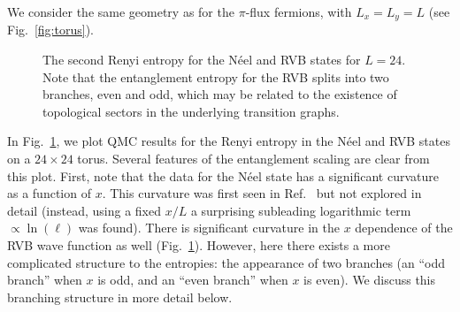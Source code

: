 \documentclass[prl,aps,twocolumn,floatfix,amsmath,amssymb,superscriptaddress,tightenlines]{revtex4}
\begin{document}
We consider the same geometry as for the $\pi$-flux fermions, with $L_x=L_y=L$ (see Fig.~\ref{fig:torus}).
 \begin{figure}
   \begin{center}
   \end{center}
   \caption{ The second Renyi entropy for the N\'eel and RVB states for $L=24$. Note that the entanglement entropy for the RVB splits into two branches, even and odd, which may be related to the existence of topological sectors in the underlying transition graphs.
   \label{fig:heis_bow} }
 \end{figure}
In Fig.~{\ref{fig:heis_bow}}, we plot QMC results for the Renyi entropy in the N\'eel and RVB states on a $24 \times 24$ torus.  
Several features of the entanglement scaling are clear from this plot.  First, note that the data for the N\'eel state has a significant curvature as a function of $x$.  This curvature was first seen in Ref.~\cite{HeisLog} but not explored in detail (instead, using a fixed $x/L$ a surprising subleading logarithmic term $\propto \ln(\ell)$ was found).
There is significant curvature in the $x$ dependence of the RVB wave function as well  (Fig.~\ref{fig:heis_bow}).  However, here there exists a more complicated structure to the entropies: the appearance of two branches (an ``odd branch'' when $x$ is odd, and an ``even branch'' when $x$ is even).  We discuss this branching structure in more detail below.
\end{document}
